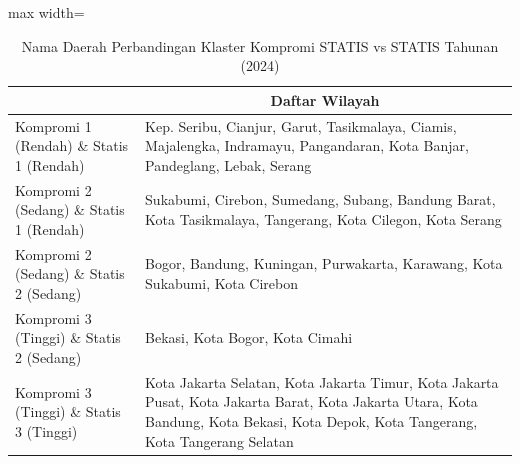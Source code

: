 \begin{table}[H]
\centering
\caption{Nama Daerah Perbandingan Klaster Kompromi STATIS vs STATIS Tahunan (2024)} \label{tab:app1comp_statis_name_2024}
\begin{adjustbox}{max width=\textwidth}
\begin{tabular}{|>{\centering\arraybackslash}p{4cm}|p{10cm}|}
\hline
\multicolumn{1}{|c|}{\textbf{Kategori}} & \multicolumn{1}{c|}{\textbf{Daftar Wilayah}} \\
\hline
Kompromi 1 (Rendah) \& Statis 1 (Rendah) & Kep. Seribu, Cianjur, Garut, Tasikmalaya, Ciamis, Majalengka, Indramayu, Pangandaran, Kota Banjar, Pandeglang, Lebak, Serang \\
\hline
Kompromi 2 (Sedang) \& Statis 1 (Rendah) & Sukabumi, Cirebon, Sumedang, Subang, Bandung Barat, Kota Tasikmalaya, Tangerang, Kota Cilegon, Kota Serang \\
\hline
Kompromi 2 (Sedang) \& Statis 2 (Sedang) & Bogor, Bandung, Kuningan, Purwakarta, Karawang, Kota Sukabumi, Kota Cirebon \\
\hline
Kompromi 3 (Tinggi) \& Statis 2 (Sedang) & Bekasi, Kota Bogor, Kota Cimahi \\
\hline
Kompromi 3 (Tinggi) \& Statis 3 (Tinggi) & Kota Jakarta Selatan, Kota Jakarta Timur, Kota Jakarta Pusat, Kota Jakarta Barat, Kota Jakarta Utara, Kota Bandung, Kota Bekasi, Kota Depok, Kota Tangerang, Kota Tangerang Selatan \\
\hline
\end{tabular}
\end{adjustbox}
\end{table}